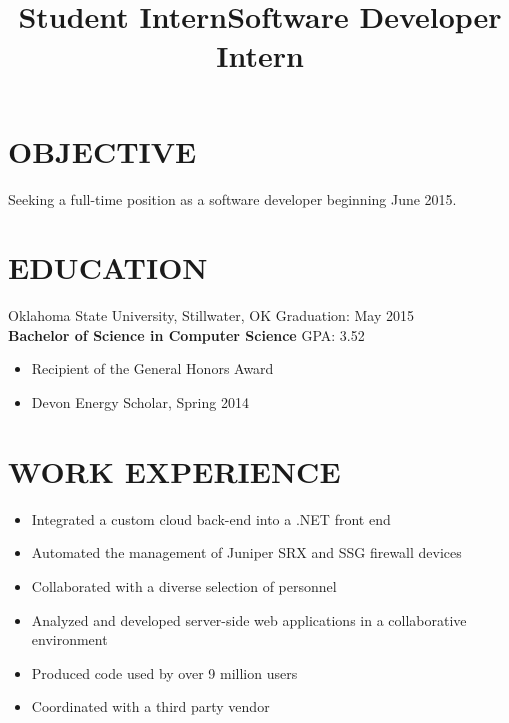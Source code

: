 \documentclass[line, overlapped]{res}
\begin{document}
\address{1875 Arbor Valley Dr \\ Edmond, OK 73025 \\ (405) 598-7827 \\ brandon@brandonsilver.com}

\begin{resume}
    \section{OBJECTIVE}
    
    Seeking a full-time position as a software developer beginning June 2015.

    \section{EDUCATION}

    Oklahoma State University, Stillwater, OK \hfill Graduation: May 2015 \\
    \textbf{Bachelor of Science in Computer Science} \hfill GPA: 3.52
    \begin{itemize}
        \item Recipient of the General Honors Award
        \item Devon Energy Scholar, Spring 2014
    \end{itemize}


	\section{WORK EXPERIENCE} 

    \title{Student Intern}
    \begin{position}
        \begin{itemize}
            \item Integrated a custom cloud back-end into a .NET front end
            \item Automated the management of Juniper SRX and SSG firewall devices
            \item Collaborated with a diverse selection of personnel
    \end{itemize}
    \end{position}

    \title{Software Developer Intern}
    \begin{position}
        \begin{itemize}
            \item Analyzed and developed server-side web applications in a collaborative environment
            \item Produced code used by over 9 million users
            \item Coordinated with a third party vendor
    \end{itemize}
    \end{position} 


\end{resume}
\end{document}
